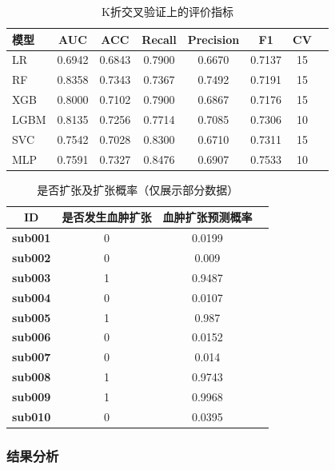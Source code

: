 \documentclass[bwprint]{gmcmthesis}
\begin{document}
\begin{table}[htbp]
    \centering
    \caption{K折交叉验证上的评价指标}
    \begin{tabular}{lccccccc}
        \hline
        模型 & AUC & ACC & Recall & Precision & F1 & CV \\
        \hline
        LR & 0.6942 & 0.6843 & 0.7900 & 0.6670 & 0.7137 & 15 \\
        RF & 0.8358 & 0.7343 & 0.7367 & 0.7492 & 0.7191 & 15 \\
        XGB & 0.8000 & 0.7102 & 0.7900 & 0.6867 & 0.7176 & 15 \\
        LGBM & 0.8135 & 0.7256 & 0.7714 & 0.7085 & 0.7306 & 10 \\
        SVC & 0.7542 & 0.7028 & 0.8300 & 0.6710 & 0.7311 & 15 \\
        MLP & 0.7591 & 0.7327 & 0.8476 & 0.6907 & 0.7533 & 10 \\
        \hline
    \end{tabular}
\end{table}

\begin{table}
\centering
\caption{是否扩张及扩张概率（仅展示部分数据）}
\label{是否扩张及扩张概率_部分表}
 \begin{spacing}{0.8}
\begin{tabular}{cccc}
\toprule
\textbf{ID} & \textbf{是否发生血肿扩张} & \textbf{血肿扩张预测概率} \\
\midrule
\textbf{sub001} & 0 & 0.0199 \\
\textbf{sub002} & 0 & 0.009 \\
\textbf{sub003} & 1 & 0.9487 \\
\textbf{sub004} & 0 & 0.0107 \\
\textbf{sub005} & 1 & 0.987 \\
\textbf{sub006} & 0 & 0.0152 \\
\textbf{sub007} & 0 & 0.014 \\
\textbf{sub008} & 1 & 0.9743 \\
\textbf{sub009} & 1 & 0.9968 \\
\textbf{sub010} & 0 & 0.0395 \\
\bottomrule
\end{tabular}
\end{spacing}
\end{table}

\subsubsection{结果分析}
\end{document}
